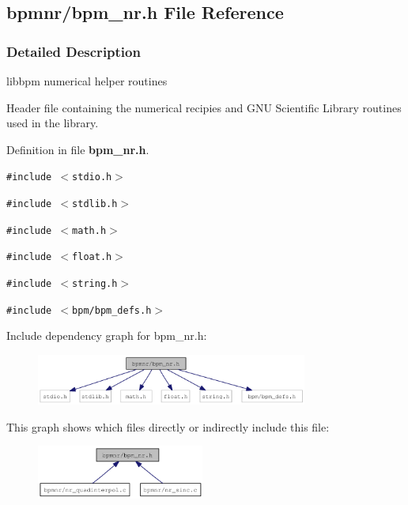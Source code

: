 \subsection{bpmnr/bpm\_\-nr.h File Reference}
\label{bpm__nr_8h}


\subsubsection{Detailed Description}
libbpm numerical helper routines 

Header file containing the numerical recipies and GNU Scientific Library routines used in the library. 

Definition in file {\bf bpm\_\-nr.h}.

{\tt \#include $<$stdio.h$>$}\par
{\tt \#include $<$stdlib.h$>$}\par
{\tt \#include $<$math.h$>$}\par
{\tt \#include $<$float.h$>$}\par
{\tt \#include $<$string.h$>$}\par
{\tt \#include $<$bpm/bpm\_\-defs.h$>$}\par


Include dependency graph for bpm\_\-nr.h:\nopagebreak
\begin{figure}[H]
\begin{center}
\leavevmode
\includegraphics[width=253pt]{bpm__nr_8h__incl}
\end{center}
\end{figure}


This graph shows which files directly or indirectly include this file:\nopagebreak
\begin{figure}[H]
\begin{center}
\leavevmode
\includegraphics[width=156pt]{bpm__nr_8h__dep__incl}
\end{center}
\end{figure}
